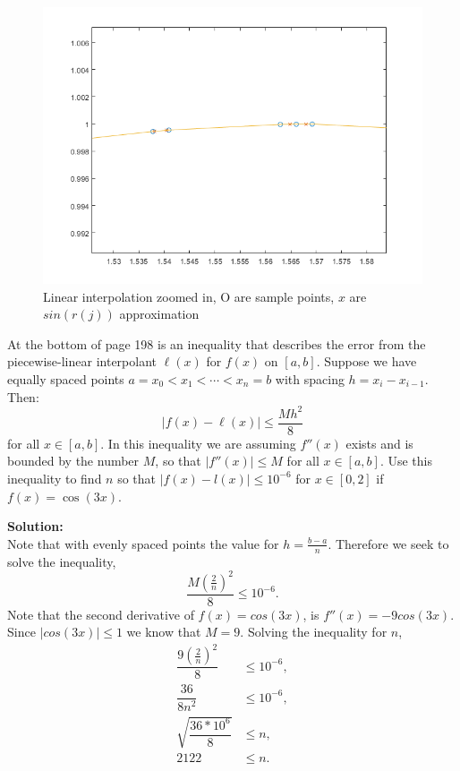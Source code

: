 \documentclass[12pt]{article}
\makeatletter
\theoremstyle{homework}
\newenvironment{exercise}[1]
{\def\@currentlabel{#1}\exercisecore}
{\endexercisecore}
\newcommand{\localhead}[1]{\par\smallskip\noindent\textbf{#1}\nobreak\\}%
\newcommand\solution{\localhead{Solution:}}
\makeatother
\begin{document}
\begin{exercise}{Text 8.8}
\begin{enumerate}
   \begin{figure}[H]
    \caption{Linear interpolation zoomed in, O are sample points, $x$ are $sin(r(j))$ approximation}
    \includegraphics[width = .80\textwidth]{linear_interpolation_zoom.png}  
    \centering
 \end{figure}
  \end{enumerate}
\end{exercise}
\vspace{.5in}














\begin{exercise}{Supplemental 2}
At the bottom of page 198 is an inequality that describes the error from the piecewise-linear interpolant $\ell(x)$ for $f(x)$ on $[a, b]$. Suppose we have equally spaced points $a=x_0 <x_1 <\cdots<x_n =b$ with spacing
$h=x_i-x_{i-1}$. Then:
\[
|f(x)-\ell(x)|\le\frac{Mh^2}{8}
\]
for all $x\in[a,b]$.
In this inequality we are assuming $f''(x)$ exists and is bounded by the number $M$, so that $|f''(x)| \le M$ for all $x \in [a,b]$.
Use this inequality  to find $n$ so that $|f(x)-l(x)| \le 10^{-6}$
for $x \in [0,2] $ if $f(x) = \cos(3x)$.\\
\solution Note that with evenly spaced points the value for $h = \frac{b - a}{n}$. Therefore we seek to solve the inequality,
\begin{equation*}
  \dfrac{M(\frac{2}{n})^2}{8} \le 10^{-6}.
\end{equation*} 
Note that the second derivative of $f(x) = cos(3x)$, is $f''(x) = -9cos(3x)$. Since $|cos(3x)|\le 1$ we know that $M = 9$. Solving the inequality for $n$,
\begin{align*}
  \dfrac{9(\frac{2}{n})^2}{8} &\le 10^{-6},\\
  \dfrac{36}{8n^2} &\le 10^{-6},\\
  \sqrt{\dfrac{36 * 10^{6}}{8}} &\le n,\\
  2122 &\le n.
\end{align*}






\end{exercise}
\end{document}
